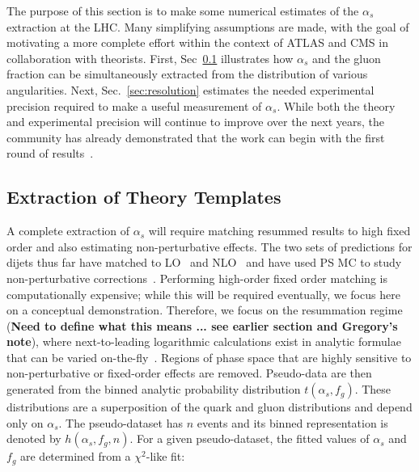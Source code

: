 
The purpose of this section is to make some numerical estimates of the $\alpha_s$ extraction at the LHC.  Many simplifying assumptions are made, with the goal of motivating a more complete effort within the context of ATLAS and CMS in collaboration with theorists.   First, Sec~\ref{sec:templates} illustrates how $\alpha_s$ and the gluon fraction can be simultaneously extracted from the distribution of various angularities.  Next, Sec.~\ref{sec:resolution} estimates the needed experimental precision required to make a useful measurement of $\alpha_s$.   While both the theory and experimental precision will continue to improve over the next years, the community has already demonstrated that the work can begin with the first round of results~\cite{Aaboud:2017qwh,CMS-PAS-SMP-16-010,Frye:2016aiz,Frye:2016okc,Marzani:2017mva,Marzani:2017kqd}.

\subsection{Extraction of Theory Templates}
\label{sec:templates}

A complete extraction of $\alpha_s$ will require matching resummed results to high fixed order and also estimating non-perturbative effects.  The two sets of predictions for dijets thus far have matched to LO~\cite{Frye:2016aiz,Frye:2016okc} and NLO~\cite{Marzani:2017mva,Marzani:2017kqd} and have used PS MC to study non-perturbative corrections~\cite{Marzani:2017mva,Marzani:2017kqd}.  Performing high-order fixed order matching is computationally expensive; while this will be required eventually, we focus here on a conceptual demonstration.  Therefore, we focus on the resummation regime (\textbf{Need to define what this means ... see earlier section and Gregory's note}), where next-to-leading logarithmic calculations exist in analytic formulae that can be varied on-the-fly~\cite{Marzani:2017mva,Marzani:2017kqd}.  Regions of phase space that are highly sensitive to non-perturbative or fixed-order effects are removed.  Pseudo-data are then generated from the binned analytic probability distribution $t(\alpha_s,f_g)$.  These distributions are a superposition of the quark and gluon distributions and depend only on $\alpha_s$.  The pseudo-dataset has $n$ events and its binned representation is denoted by  $h(\alpha_s,f_g,n)$.  For a given pseudo-dataset, the fitted values of $\alpha_s$ and $f_g$ are determined from a $\chi^2$-like fit:

